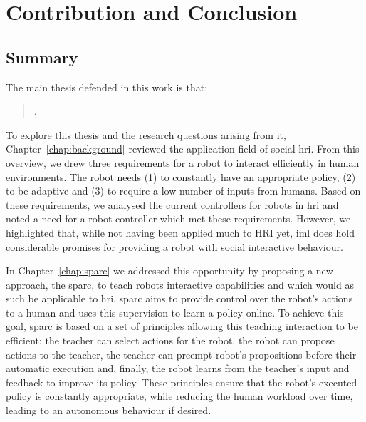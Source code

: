 \chapter{Contribution and Conclusion} \label{chap:conclusion}
\glsresetall

\section{Summary}\label{sec:conc_summary}

The main thesis defended in this work is that: 
\begin{quote}
	\thesis. 
\end{quote}

To explore this thesis and the research questions arising from it, Chapter~\ref{chap:background}  reviewed the application field of social \gls{hri}. From this overview, we drew three requirements for a robot to interact efficiently in human environments. The robot needs (1) to constantly have an appropriate policy, (2) to be adaptive and (3) to require a low number of inputs from humans. Based on these requirements, we analysed the current controllers for robots in \gls{hri} and noted a need for a robot controller which met these requirements. However, we highlighted that, while not having been applied much to HRI yet, \gls{iml} does hold considerable promises for providing a robot with social interactive behaviour.

In Chapter~\ref{chap:sparc} we addressed this opportunity by proposing a new approach, the \gls{sparc}, to teach robots interactive capabilities and which would as such be applicable to \gls{hri}. \gls{sparc} aims to provide control over the robot's actions to a human and uses this supervision to learn a policy online. To achieve this goal, \gls{sparc} is based on a set of principles allowing this teaching interaction to be efficient: the teacher can select actions for the robot, the robot can propose actions to the teacher, the teacher can preempt robot's propositions before their automatic execution and, finally, the robot learns from the teacher's input and feedback to improve its policy. These principles ensure that the robot's executed policy is constantly appropriate, while reducing the human workload over time, leading to an autonomous behaviour if desired.

